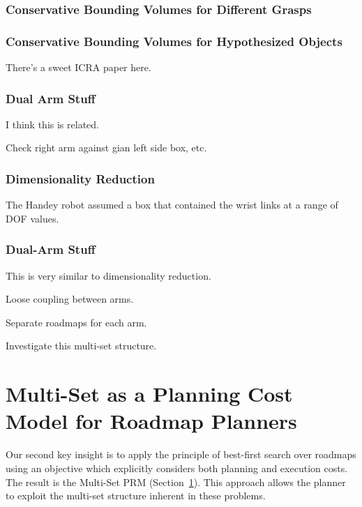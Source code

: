 \subsubsection*{Conservative Bounding Volumes for Different Grasps}

\subsubsection*{Conservative Bounding Volumes for Hypothesized Objects}

There's a sweet ICRA paper here.

\subsubsection*{Dual Arm Stuff}

I think this is related.

Check right arm against gian left side box, etc.

\subsubsection*{Dimensionality Reduction}

The Handey \cite{lozanoperez1987handey} robot
assumed a box that contained the wrist links at a range of DOF values.

\subsubsection*{Dual-Arm Stuff}

This is very similar to dimensionality reduction.

Loose coupling between arms.

Separate roadmaps for each arm.

Investigate this multi-set structure.




\section{Multi-Set as a Planning Cost Model for Roadmap Planners}
\label{chap:multi-set-prm}

Our second key insight
is to apply the principle of best-first search over roadmaps
using an objective which explicitly considers both planning and
execution costs.
The result is the Multi-Set PRM (Section~\ref{chap:multi-set-prm}).
This approach allows the planner to exploit the multi-set structure
inherent in these problems.

